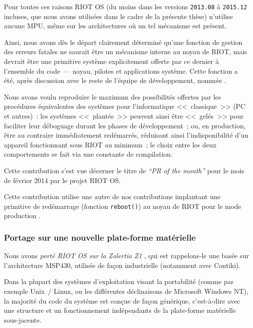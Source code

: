 Pour toutes ces raisons RIOT OS (du moins dans les versions \texttt{2013.08}
à \texttt{2015.12} incluses, que nous avons utilisées dans le cadre de
la présente thèse) n'utilise aucune MPU, même sur les architectures
où un tel mécanisme est présent.

\smallskip

Ainsi, nous avons dès le départ clairement déterminé qu'une fonction
de gestion des erreurs fatales ne saurait être un mécanisme interne
au noyau de RIOT, mais devrait être une primitive système explicitement
offerte par ce dernier à l'ensemble du code~--- noyau, pilotes et
applications système. Cette fonction a été, après discussion avec le
reste de l'équipe de développement, nommée .

Nous avons voulu reproduire le maximum des possibilités offertes
par les procédures équivalentes des systèmes pour l'informatique
<<~classique~>> (PC et autres)~: les systèmes <<~plantés~>> peuvent
ainsi être <<~gelés~>> pour faciliter leur déboguage durant les phases de
développement~; ou, en production, être au contraire immédiatement
redémarrés, réduisant ainsi l'indisponibilité d'un appareil fonctionnant
sous RIOT au minimum~; le choix entre les deux comportements se fait
via une constante de compilation.

Cette contribution s'est vue décerner le titre de \emph{``PR of the
month''} pour le mois de février 2014 par le projet RIOT OS.

Cette contribution utilise une autre de nos contributions implantant
une primitive de redémarrage (fonction \texttt{reboot()}) au noyau de RIOT
pour le mode production \cite{PRriotEnh5} \cite{PRriotEnh3}.

\subsubsection{Portage sur une nouvelle plate-forme matérielle}
\label{ParRIOTZolertiaZ1}

Nous avons \emph{porté RIOT OS sur la Zolertia Z1} \cite{PRriotPortZ1},
qui est rappelons-le une  basée sur l'architecture MSP430,
utilisée de façon industrielle (notamment avec Contiki).

\smallskip

Dans la plupart des systèmes d'exploitation visant la portabilité (comme
par exemple Unix~/ Linux, ou les différentes déclinaisons de Microsoft
Windows NT), la majorité du code du système est conçue de façon générique,
c'est-à-dire avec une structure et un fonctionnement indépendants de la
plate-forme matérielle sous-jacente.

